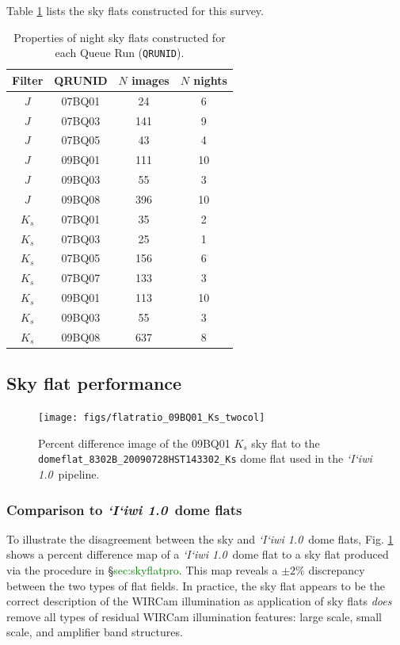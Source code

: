 \documentclass[iop]{emulateapj}
\newcommand{\sw}[1]{\textit{#1}} %
\newcommand{\iiwione}{\sw{`I`iwi 1.0}}
\newcommand{\todo}[1]{\textcolor{green}{#1}} %
\begin{document}
\noindent Table \ref{tab:flattable} lists the sky flats constructed for this survey.

\begin{table}[t]
    \centering
    \caption{Properties of night sky flats constructed for each Queue Run (\texttt{QRUNID}).}
    \label{tab:flattable}

\begin{tabular}{cccc}
\hline
Filter & QRUNID & $N$ images & $N$ nights \\
\hline
$J$ & 07BQ01 & 24 & 6 \\
$J$ & 07BQ03 & 141 & 9 \\
$J$ & 07BQ05 & 43 & 4 \\
$J$ & 09BQ01 & 111 & 10 \\
$J$ & 09BQ03 & 55 & 3 \\
$J$ & 09BQ08 & 396 & 10 \\
\hline
$K_s$ & 07BQ01 & 35 & 2 \\
$K_s$ & 07BQ03 & 25 & 1 \\
$K_s$ & 07BQ05 & 156 & 6 \\
$K_s$ & 07BQ07 & 133 & 3 \\
$K_s$ & 09BQ01 & 113 & 10 \\
$K_s$ & 09BQ03 & 55 & 3 \\
$K_s$ & 09BQ08 & 637 & 8 \\
\hline
\end{tabular}
\end{table}

\subsection{Sky flat performance}
\label{sec:skyflatstats}

\begin{figure}[t]
   \centering
    \texttt{[image: figs/flatratio\_09BQ01\_Ks\_twocol]}
   \caption{Percent difference image of the 09BQ01 $K_s$ sky flat to the \texttt{domeflat\_8302B\_20090728HST143302\_Ks} dome flat used in the \iiwione\ pipeline.}
   \label{fig:domeflatratio}
\end{figure}

\subsubsection{Comparison to \iiwione\ dome flats}


To illustrate the disagreement between the sky and \iiwione\ dome flats, Fig. \ref{fig:domeflatratio} shows a percent difference map of a \iiwione\ dome flat to a sky flat produced via the procedure in \S \todo{sec:skyflatpro}. This map reveals a $\pm2\%$ discrepancy between the two types of flat fields.
In practice, the sky flat appears to be the correct description of the WIRCam illumination as application of sky flats \emph{does} remove all types of residual WIRCam illumination features: large scale, small scale, and amplifier band structures.
\end{document}
